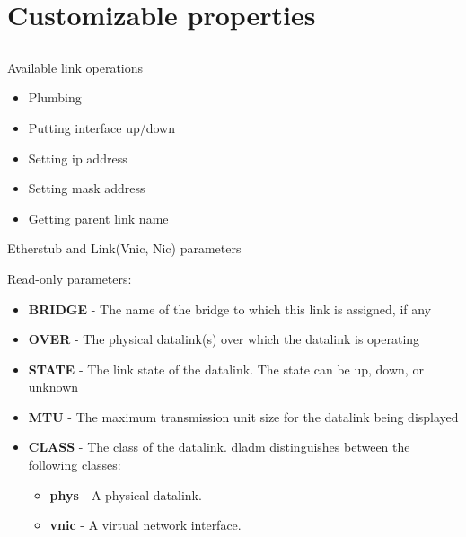 \documentclass{beamer}
\begin{document}
\section{Customizable properties}

	\subsection{}

		\begin{frame}{Available link operations}

			\begin{itemize}
				\item Plumbing
				\item Putting interface up/down
				\item Setting ip address
				\item Setting mask address
				\item Getting parent link name				
			\end{itemize}
		\end{frame}


		\begin{frame}{Etherstub and Link(Vnic, Nic) parameters }

			Read-only parameters:
			
			\begin{itemize}

				\item \textbf{BRIDGE} - The name of the bridge to which this link is assigned, if any
				\item \textbf{OVER} - The physical datalink(s) over which the datalink is operating
				\item \textbf{STATE} - The link state of the datalink. The state can be up, down, or unknown
				\item \textbf{MTU} - The maximum transmission unit size for the datalink being displayed
				\item \textbf{CLASS} - The class of the datalink. dladm distinguishes between the following classes:

					\begin{itemize}
						\item \textbf{phys} - A physical datalink. 
						\item \textbf{vnic} - A virtual network interface. 				
					\end{itemize}			
			\end{itemize}

		\end{frame}
\end{document}
